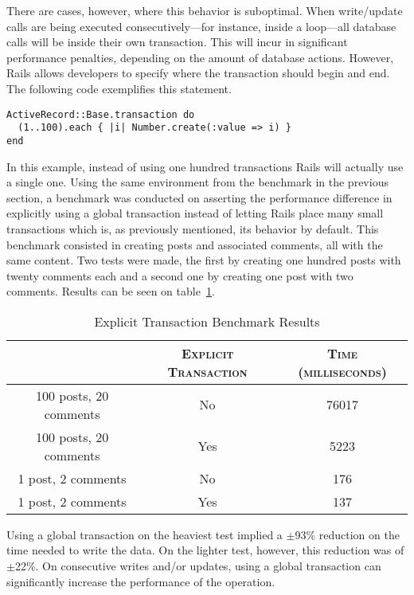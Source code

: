 There are cases, however, where this behavior is suboptimal. When write/update calls are being executed consecutively---for instance, inside a loop---all database calls will be inside their own transaction. This will incur in significant performance penalties, depending on the amount of database actions. However, Rails allows developers to specify where the transaction should begin and end. The following code exemplifies this statement.
\begin{lstlisting}[xleftmargin=30pt,xrightmargin=30pt]
ActiveRecord::Base.transaction do
  (1..100).each { |i| Number.create(:value => i) }
end
\end{lstlisting}
In this example, instead of using one hundred transactions Rails will actually use a single one. Using the same environment from the benchmark in the previous section, a benchmark was conducted on asserting the performance difference in explicitly using a global transaction instead of letting Rails place many small transactions which is, as previously mentioned, its behavior by default. This benchmark consisted in creating posts and associated comments, all with the same content. Two tests were made, the first by creating one hundred posts with twenty comments each and a second one by creating one post with two comments. Results can be seen on table~\ref{tab:transaction}.
\begin{table}[h!t]
  \centering
  \caption{Explicit Transaction Benchmark Results}
  \label{tab:transaction}
  
  \begin{tabular}{c|c|c}
  
    & \textbf{\textsc{Explicit Transaction}} & \textbf{\textsc{Time (milliseconds)}} \\ \hline
    100 posts, 20 comments & No & 76017 \\ \hline
    100 posts, 20 comments & Yes & 5223 \\ \hline
    1 post, 2 comments & No & 176 \\ \hline
    1 post, 2 comments & Yes & 137 \\
  \end{tabular}
\end{table}

Using a global transaction on the heaviest test implied a $\pm$93\% reduction on the time needed to write the data. On the lighter test, however, this reduction was of $\pm$22\%. On consecutive writes and/or updates, using a global transaction can significantly increase the performance of the operation.


